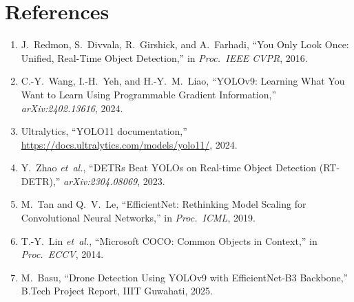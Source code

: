 \documentclass[12pt,a4paper]{report}
\begin{document}
\chapter*{References}
\begin{enumerate}[noitemsep]
    \item J.~Redmon, S.~Divvala, R.~Girshick, and A.~Farhadi, ``You Only Look
          Once: Unified, Real-Time Object Detection,'' in \textit{Proc.\ IEEE
          CVPR}, 2016.
    \item C.-Y.~Wang, I.-H.~Yeh, and H.-Y.~M.~Liao, ``YOLOv9: Learning What
          You Want to Learn Using Programmable Gradient Information,''
          \textit{arXiv:2402.13616}, 2024.
    \item Ultralytics, ``YOLO11 documentation,''
          \url{https://docs.ultralytics.com/models/yolo11/}, 2024.
    \item Y.~Zhao \textit{et~al.}, ``DETRs Beat YOLOs on Real-time Object
          Detection (RT-DETR),'' \textit{arXiv:2304.08069}, 2023.
    \item M.~Tan and Q.~V.~Le, ``EfficientNet: Rethinking Model Scaling for
          Convolutional Neural Networks,'' in \textit{Proc.\ ICML}, 2019.
    \item T.-Y.~Lin \textit{et~al.}, ``Microsoft COCO: Common Objects in
          Context,'' in \textit{Proc.\ ECCV}, 2014.
    \item M.~Basu, ``Drone Detection Using YOLOv9 with EfficientNet-B3
          Backbone,'' B.Tech Project Report, IIIT Guwahati, 2025.
\end{enumerate}
\end{document}
